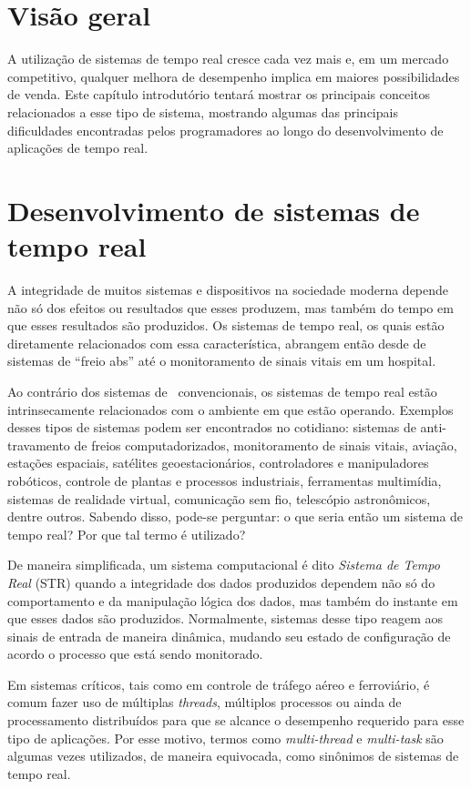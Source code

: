 \section{Visão geral}
A utilização de sistemas de tempo real cresce cada vez mais e, em um mercado
competitivo, qualquer melhora de desempenho implica em maiores possibilidades de
venda. Este capítulo introdutório tentará mostrar os principais conceitos
relacionados a esse tipo de sistema, mostrando algumas das principais
dificuldades encontradas pelos programadores ao longo do desenvolvimento de
aplicações de tempo real.

\section{Desenvolvimento de sistemas de tempo real}
A integridade de muitos sistemas e dispositivos na sociedade moderna depende não
só dos efeitos ou resultados que esses produzem, mas também do tempo em que
esses resultados são produzidos. Os sistemas de tempo real, os quais estão
diretamente relacionados com essa característica, abrangem então desde de
sistemas de ``freio abs'' até o monitoramento de sinais vitais em um hospital.

Ao contrário dos sistemas de \soft\ convencionais, os sistemas de tempo real
estão intrinsecamente relacionados com o ambiente em que estão operando.
Exemplos desses tipos de sistemas podem ser encontrados no cotidiano: sistemas
de anti-travamento de freios computadorizados, monitoramento de sinais vitais,
aviação, estações espaciais, satélites geoestacionários, controladores e
manipuladores robóticos, controle de plantas e processos industriais,
ferramentas multimídia, sistemas de realidade virtual, comunicação sem fio,
telescópio astronômicos, dentre outros. Sabendo disso, pode-se perguntar: o que
seria então um sistema de tempo real?  Por que tal termo é utilizado? 

De maneira simplificada, um sistema computacional é dito {\it Sistema de Tempo
Real} (STR) quando a integridade dos dados produzidos dependem não só do
comportamento e da manipulação lógica dos dados, mas também do instante em que
esses dados são produzidos. Normalmente, sistemas desse tipo reagem aos sinais
de entrada de maneira dinâmica, mudando seu estado de configuração de acordo o
processo que está sendo monitorado.

Em sistemas críticos, tais como em controle de tráfego aéreo e ferroviário, é
comum fazer uso de múltiplas {\it threads}, múltiplos processos ou ainda
de processamento distribuídos para que se alcance o desempenho requerido para
esse tipo de aplicações. Por esse motivo, termos como {\it multi-thread} e {\it
multi-task} são algumas vezes utilizados, de maneira equivocada, como sinônimos
de sistemas de tempo real.

